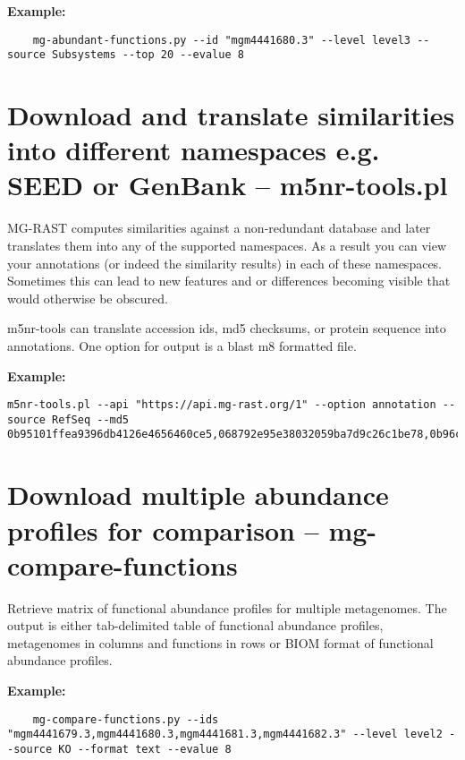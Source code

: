 \textbf{Example:}
\begin{lstlisting}
    mg-abundant-functions.py --id "mgm4441680.3" --level level3 --source Subsystems --top 20 --evalue 8
\end{lstlisting}
\section{Download and translate similarities into different namespaces e.g. SEED or GenBank -- m5nr-tools.pl}

MG-RAST computes similarities against a non-redundant database \cite{M5NR} and later translates them into any of the supported namespaces. As a result you can view your annotations (or indeed the similarity results) in each of these namespaces. Sometimes this can lead to new features and or differences becoming visible that would otherwise be obscured.

m5nr-tools can translate accession ids, md5 checksums, or protein sequence into annotations. 
One option for output is a blast m8 formatted file.


\textbf{Example:}
\begin{lstlisting}
m5nr-tools.pl --api "https://api.mg-rast.org/1" --option annotation --source RefSeq --md5 0b95101ffea9396db4126e4656460ce5,068792e95e38032059ba7d9c26c1be78,0b96c92ce600d8b2427eedbc221642f1
\end{lstlisting}

\section{Download multiple abundance profiles for comparison --  mg-compare-functions}

Retrieve matrix of functional abundance profiles for multiple metagenomes.
The output is either  tab-delimited table of functional abundance profiles, metagenomes in columns and functions in rows or BIOM format of functional abundance profiles.

\textbf{Example:}
\begin{lstlisting}
    mg-compare-functions.py --ids "mgm4441679.3,mgm4441680.3,mgm4441681.3,mgm4441682.3" --level level2 --source KO --format text --evalue 8
\end{lstlisting}






